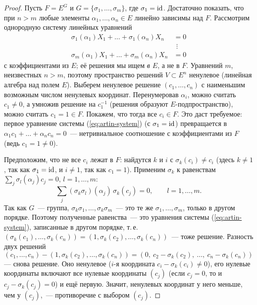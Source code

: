 \begin{proof}
Пусть $F=E^G$ и $G=\{\sigma_1,\dots,\sigma_m\}$, где $\sigma_1=\operatorname{id}$. Достаточно показать, что при $n>m$ любые элементы
$\alpha_1,\dots,\alpha_n\in E$ линейно зависимы над $F$. Рассмотрим однородную систему линейных уравнений
\begin{equation}\label{eq:artin-system}
\begin{aligned}
\sigma_1(\alpha_1)X_1+\dots+\sigma_1(\alpha_n)X_n&=0\\
&\ \,\vdots\\
\sigma_m(\alpha_1)X_1+\dots+\sigma_m(\alpha_n)X_n&=0
\end{aligned}
\end{equation}
с коэффициентами из $E$; её решения мы ищем \emph{в $E$}, а не в $F$. Уравнений $m$, неизвестных $n>m$, поэтому
пространство решений $V\subset E^n$ ненулевое (линейная алгебра над полем $E$). Выберем ненулевое решение
$(c_1,\dots,c_n)$ с наименьшим возможным числом ненулевых координат. Перенумеровав $\alpha_i$, можно считать $c_1\ne0$, а
умножив решение на $c_1^{-1}$ (решения образуют $E$-подпространство), можно считать $c_1=1\in F$. Покажем, что тогда все
$c_i\in F$. Это даст требуемое: первое уравнение системы (\ref{eq:artin-system}) (с $\sigma_1=\operatorname{id}$) превращается в
$\alpha_1c_1+\dots+\alpha_nc_n=0$~--- нетривиальное соотношение с коэффициентами из $F$ (ведь $c_1=1\ne0$).

Предположим, что не все $c_i$ лежат в $F$: найдутся $k$ и $i$ с $\sigma_k(c_i)\ne c_i$ (здесь $k\ne1$, так как $\sigma_1=\operatorname{id}$,
и $i\ne1$, так как $c_1=1$). Применим $\sigma_k$ к равенствам $\sum_j\sigma_l(\alpha_j)c_j=0$, $l=1,\dots,m$:
\[
\sum_j(\sigma_k\sigma_l)(\alpha_j)\,\sigma_k(c_j)=0,\qquad l=1,\dots,m.
\]
Так как $G$~--- группа, $\sigma_k\sigma_1,\dots,\sigma_k\sigma_m$~--- это те же $\sigma_1,\dots,\sigma_m$, только в другом порядке.
Поэтому полученные равенства~--- это уравнения системы (\ref{eq:artin-system}), записанные в другом порядке, т.\,е.\
$(\sigma_k(c_1),\dots,\sigma_k(c_n))=(1,\sigma_k(c_2),\dots,\sigma_k(c_n))$~--- тоже решение. Разность двух решений
\[
(c_1,\dots,c_n)-(1,\sigma_k(c_2),\dots,\sigma_k(c_n))=(0,\ c_2-\sigma_k(c_2),\ \dots,\ c_n-\sigma_k(c_n))
\]
--- снова решение. Оно ненулевое ($i$-я координата $c_i-\sigma_k(c_i)\ne0$), его нулевые координаты включают все нулевые
координаты $(c_j)$ (если $c_j=0$, то и $c_j-\sigma_k(c_j)=0$) и ещё первую. Значит, ненулевых координат у него меньше,
чем у $(c_j)$,~--- противоречие с выбором $(c_j)$.
\end{proof}


